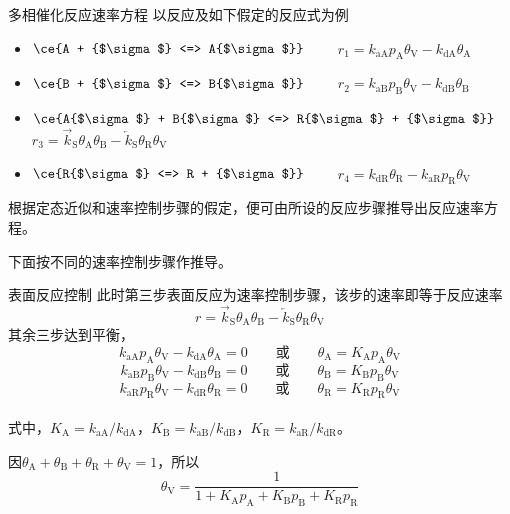 \begin{frame}{多相催化反应速率方程}
    以反应及如下假定的反应式为例
    \bigskip

        \begin{minipage}{0.08\linewidth}
            
        \end{minipage}\hfill
        \begin{minipage}{0.88\linewidth}
            \begin{itemize}
                \item[\highlight{A吸附}]  $\ce{A + {$\sigma$} <=> A{$\sigma$}}$ \qquad ~~~~\qquad $r_1=k_\mathrm{aA}p_\mathrm{A}\theta_\mathrm{V}-k_\mathrm{dA}\theta_\mathrm{A}$
                \item[\highlight{B吸附}]  $\ce{B + {$\sigma$} <=> B{$\sigma$}}$ \qquad ~~~~\qquad $r_2=k_\mathrm{aB}p_\mathrm{B}\theta_\mathrm{V}-k_\mathrm{dB}\theta_\mathrm{B}$
                \item[\highlight{表面反应}]  $\ce{A{$\sigma$} + B{$\sigma$} <=> R{$\sigma$} + {$\sigma$}}$ \qquad $r_3=\overrightarrow{k}_\mathrm{S}\theta_\mathrm{A}\theta_\mathrm{B}-\overleftarrow{k}_\mathrm{S}\theta_\mathrm{R}\theta_\mathrm{V}$
                \item[\highlight{R脱附}]  $\ce{R{$\sigma$} <=> R + {$\sigma$}}$ \qquad ~~~~\qquad $r_4=k_\mathrm{dR}\theta_\mathrm{R}-k_\mathrm{aR}p_\mathrm{R}\theta_\mathrm{V}$
            \end{itemize}
        \end{minipage}
\bigskip

    根据定态近似和速率控制步骤的假定，便可由所设的反应步骤推导出反应速率方程。
    
    下面按不同的速率控制步骤作推导。
\end{frame}


\begin{frame}{表面反应控制}
    此时第三步表面反应为速率控制步骤，该步的速率即等于反应速率
    $$r=\overrightarrow{k}_\mathrm{S}\theta_\mathrm{A}\theta_\mathrm{B}-\overleftarrow{k}_\mathrm{S}\theta_\mathrm{R}\theta_\mathrm{V}$$
    其余三步达到平衡，
    $$k_\mathrm{aA}p_\mathrm{A}\theta_\mathrm{V}-k_\mathrm{dA}\theta_\mathrm{A}=0 \qquad \text{或} \qquad \theta_\mathrm{A}= K_\mathrm{A}p_\mathrm{A}\theta_\mathrm{V}$$
    $$k_\mathrm{aB}p_\mathrm{B}\theta_\mathrm{V}-k_\mathrm{dB}\theta_\mathrm{B}=0 \qquad \text{或} \qquad \theta_\mathrm{B}= K_\mathrm{B}p_\mathrm{B}\theta_\mathrm{V}$$
    $$k_\mathrm{aR}p_\mathrm{R}\theta_\mathrm{V}-k_\mathrm{dR}\theta_\mathrm{R}=0  \qquad \text{或} \qquad \theta_\mathrm{R}= K_\mathrm{R}p_\mathrm{R}\theta_\mathrm{V}$$
    \\式中，$K_\mathrm{A}=k_\mathrm{aA}/k_\mathrm{dA}$，$K_\mathrm{B}=k_\mathrm{aB}/k_\mathrm{dB}$，$K_\mathrm{R}=k_\mathrm{aR}/k_\mathrm{dR}$。

    因$\theta_\mathrm{A}+\theta_\mathrm{B}+\theta_\mathrm{R}+\theta_\mathrm{V}=1$，所以$$\theta_\mathrm{V}=\frac{1}{1+K_\mathrm{A}p_\mathrm{A}+K_\mathrm{B}p_\mathrm{B}+K_\mathrm{R}p_\mathrm{R}}$$
\end{frame}


